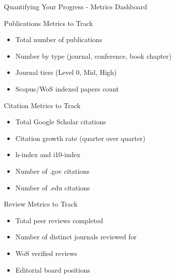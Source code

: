 \documentclass[11pt]{beamer}
\begin{document}
				\begin{frame}{Quantifying Your Progress - Metrics Dashboard}
					\scriptsize
					\begin{block}{Publications Metrics to Track}
						\begin{itemize}
							\item Total number of publications
							\item Number by type (journal, conference, book chapter)
							\item Journal tiers (Level 0, Mid, High)
							\item Scopus/WoS indexed papers count
						\end{itemize}
					\end{block}
					\begin{block}{Citation Metrics to Track}
						\begin{itemize}
							\item Total Google Scholar citations
							\item Citation growth rate (quarter over quarter)
							\item h-index and i10-index
							\item Number of .gov citations
							\item Number of .edu citations
						\end{itemize}
					\end{block}
					\begin{block}{Review Metrics to Track}
						\begin{itemize}
							\item Total peer reviews completed
							\item Number of distinct journals reviewed for
							\item WoS verified reviews
							\item Editorial board positions
						\end{itemize}
					\end{block}
				\end{frame}
				
\end{document}
